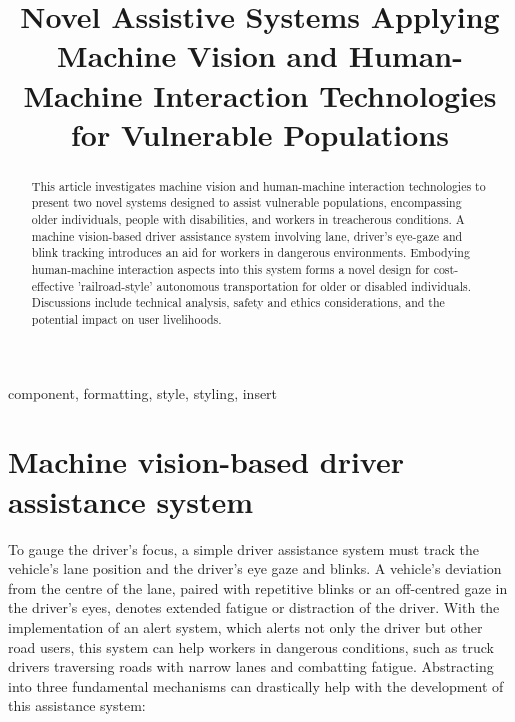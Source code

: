 \documentclass[9pt,conference]{IEEEtran}
\begin{document}
\title{Novel Assistive Systems Applying Machine Vision and Human-Machine Interaction Technologies for Vulnerable Populations}

\author{
}

\maketitle

\begin{abstract}
    This article investigates machine vision and human-machine interaction technologies to present two novel systems designed to assist vulnerable populations, encompassing older individuals, people with disabilities, and workers in treacherous conditions. A machine vision-based driver assistance system involving lane, driver's eye-gaze and blink tracking introduces an aid for workers in dangerous environments. Embodying human-machine interaction aspects into this system forms a novel design for cost-effective 'railroad-style' autonomous transportation for older or disabled individuals. Discussions include technical analysis, safety and ethics considerations, and the potential impact on user livelihoods.
\end{abstract}

\begin{IEEEkeywords}
component, formatting, style, styling, insert
\end{IEEEkeywords}

\section{Machine vision-based driver assistance system}
To gauge the driver's focus, a simple driver assistance system must track the vehicle's lane position and the driver's eye gaze and blinks. A vehicle's deviation from the centre of the lane, paired with repetitive blinks or an off-centred gaze in the driver's eyes, denotes extended fatigue or distraction of the driver. With the implementation of an alert system, which alerts not only the driver but other road users, this system can help workers in dangerous conditions, such as truck drivers traversing roads with narrow lanes and combatting fatigue. Abstracting into three fundamental mechanisms can drastically help with the development of this assistance system:
\end{document}
